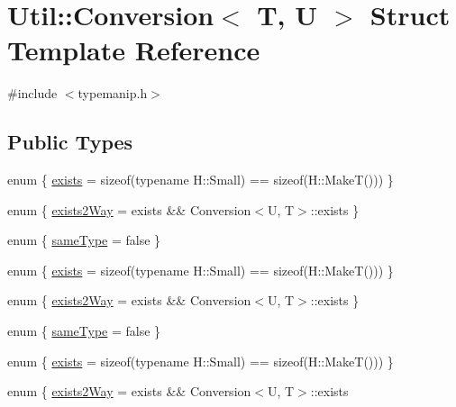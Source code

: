 \hypertarget{structUtil_1_1Conversion}{}\section{Util\+:\+:Conversion$<$ T, U $>$ Struct Template Reference}
\label{structUtil_1_1Conversion}


{\ttfamily \#include $<$typemanip.\+h$>$}

\subsection*{Public Types}
\begin{DoxyCompactItemize}
\item 
enum \{ \mbox{\hyperlink{structUtil_1_1Conversion_a85e1e7e32a81ebadbb1f987994283ab7a66cec7f52af17b9d2055795f332f3435}{exists}} = sizeof(typename H\+:\+:Small) == sizeof(H\+:\+:MakeT()))
 \}
\item 
enum \{ \mbox{\hyperlink{structUtil_1_1Conversion_aaa3b3e4fee0a3d87951a2e788aaa14aba57b873c1826056eca5f6fb7d56ccb11f}{exists2\+Way}} = exists \&\& Conversion$<$U, T$>$\+:\+:exists
 \}
\item 
enum \{ \mbox{\hyperlink{structUtil_1_1Conversion_a4da7b6dc72f967fd56f78ae38dc05595a13c57e92754abd0dafc432097f46553d}{same\+Type}} = false
 \}
\item 
enum \{ \mbox{\hyperlink{structUtil_1_1Conversion_a85e1e7e32a81ebadbb1f987994283ab7a66cec7f52af17b9d2055795f332f3435}{exists}} = sizeof(typename H\+:\+:Small) == sizeof(H\+:\+:MakeT()))
 \}
\item 
enum \{ \mbox{\hyperlink{structUtil_1_1Conversion_aaa3b3e4fee0a3d87951a2e788aaa14aba57b873c1826056eca5f6fb7d56ccb11f}{exists2\+Way}} = exists \&\& Conversion$<$U, T$>$\+:\+:exists
 \}
\item 
enum \{ \mbox{\hyperlink{structUtil_1_1Conversion_a4da7b6dc72f967fd56f78ae38dc05595a13c57e92754abd0dafc432097f46553d}{same\+Type}} = false
 \}
\item 
enum \{ \mbox{\hyperlink{structUtil_1_1Conversion_a85e1e7e32a81ebadbb1f987994283ab7a66cec7f52af17b9d2055795f332f3435}{exists}} = sizeof(typename H\+:\+:Small) == sizeof(H\+:\+:MakeT()))
 \}
\item 
enum \{ \mbox{\hyperlink{structUtil_1_1Conversion_aaa3b3e4fee0a3d87951a2e788aaa14aba57b873c1826056eca5f6fb7d56ccb11f}{exists2\+Way}} = exists \&\& Conversion$<$U, T$>$\+:\+:exists

\end{DoxyCompactItemize}
